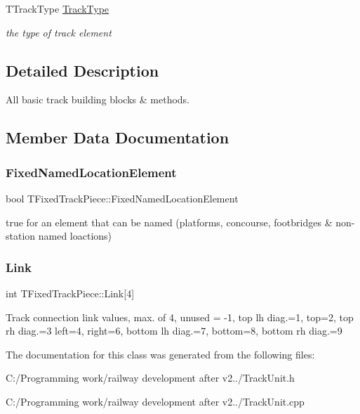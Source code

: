 \begin{DoxyCompactItemize}
\mbox{\label{class_t_fixed_track_piece_ad6c717a22333f52d1158dc57319e9e2a}} 
T\+Track\+Type \mbox{\hyperlink{class_t_fixed_track_piece_ad6c717a22333f52d1158dc57319e9e2a}{Track\+Type}}
\begin{DoxyCompactList}\small\item\em the type of track element \end{DoxyCompactList}\end{DoxyCompactItemize}


\subsection{Detailed Description}
All basic track building blocks \& methods. 

\subsection{Member Data Documentation}
\mbox{\label{class_t_fixed_track_piece_a2d225bf10a7fb1c7e8ffd924b4d4ed2a}} 
\subsubsection{\texorpdfstring{Fixed\+Named\+Location\+Element}{FixedNamedLocationElement}}
{\footnotesize\ttfamily bool T\+Fixed\+Track\+Piece\+::\+Fixed\+Named\+Location\+Element}

true for an element that can be named (platforms, concourse, footbridges \& non-\/station named loactions) \mbox{\label{class_t_fixed_track_piece_a6f604279e2311669576eb9bf36d8cfee}} 
\subsubsection{\texorpdfstring{Link}{Link}}
{\footnotesize\ttfamily int T\+Fixed\+Track\+Piece\+::\+Link\mbox{[}4\mbox{]}}

Track connection link values, max. of 4, unused = -\/1, top lh diag.=1, top=2, top rh diag.=3 left=4, right=6, bottom lh diag.=7, bottom=8, bottom rh diag.=9 

The documentation for this class was generated from the following files\+:\begin{DoxyCompactItemize}
\item 
C\+:/\+Programming work/railway development after v2../Track\+Unit.\+h\item 
C\+:/\+Programming work/railway development after v2../Track\+Unit.\+cpp\end{DoxyCompactItemize}
